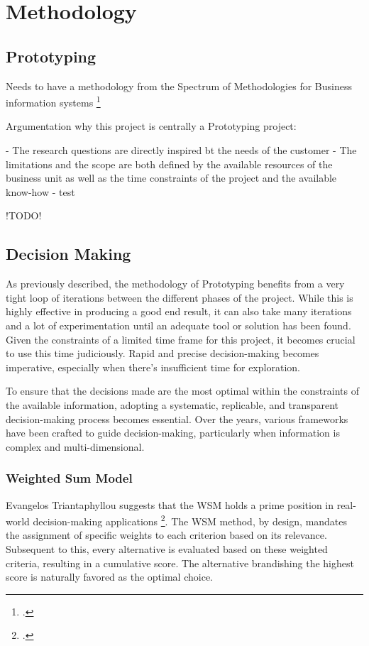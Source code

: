 \chapter{Methodology}
\label{methodology}

\section{Prototyping}

Needs to have a methodology from the Spectrum of Methodologies for Business information systems \footcite{wildeMethodenspektrumWirtschaftsinformatikUeberblick}


Argumentation why this project is centrally a Prototyping project:

 - The research questions are directly inspired bt the needs of the customer
 - The limitations and the scope are both defined by the available resources of the business unit as well as the time constraints of the project
         and the available know-how
 -  test

 !TODO!

\newpage


\section{Decision Making}
\label{decision_making}

As previously described, the methodology of Prototyping benefits from a very tight loop of iterations between the different phases of the project.
While this is highly effective in producing a good end result, it can also take many iterations and a lot of experimentation until an adequate tool or solution has been found.
Given the constraints of a limited time frame for this project, it becomes crucial to use this time judiciously. Rapid and precise decision-making becomes imperative, especially when there's insufficient time for exploration.

To ensure that the decisions made are the most optimal within the constraints of the available information, adopting a systematic, replicable, and transparent decision-making process becomes essential. Over the years, various frameworks have been crafted to guide decision-making, particularly when information is complex and multi-dimensional.

\subsection{Weighted Sum Model}
Evangelos Triantaphyllou suggests that the \ac{WSM} holds a prime position in real-world decision-making applications \footcite[p. 1]{triantaphyllouIntroductionMultiCriteriaDecision2000}. The WSM method, by design, mandates the assignment of specific weights to each criterion based on its relevance. Subsequent to this, every alternative is evaluated based on these weighted criteria, resulting in a cumulative score. The alternative brandishing the highest score is naturally favored as the optimal choice.

